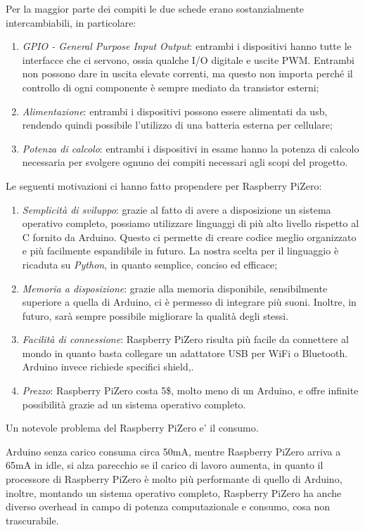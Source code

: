 \documentclass[12pt]{article}
\newcommand{\raspi}{Raspberry Pi}
\newcommand{\raszero} {\raspi Zero}
\begin{document}
Per la maggior parte dei compiti le due schede erano sostanzialmente intercambiabili, in particolare:
\begin{enumerate}
\item \emph{GPIO - General Purpose Input Output}: entrambi i dispositivi hanno tutte le interfacce che ci servono, ossia qualche I/O digitale e uscite PWM. Entrambi non possono dare in uscita elevate correnti, ma questo non importa perché il controllo di ogni componente è sempre mediato da transistor esterni;
\item \emph{Alimentazione}: entrambi i dispositivi possono essere alimentati da usb, rendendo quindi possibile l'utilizzo di una batteria esterna per cellulare;
\item \emph{Potenza di calcolo}: entrambi i dispositivi in esame hanno la potenza di calcolo necessaria per svolgere ognuno dei compiti necessari agli scopi del progetto.
\end{enumerate} 

Le seguenti motivazioni ci hanno fatto propendere per \raszero :
\begin{enumerate}
\item \emph{Semplicità di sviluppo}: grazie al fatto di avere a disposizione un sistema operativo completo, possiamo utilizzare linguaggi di più alto livello rispetto al C fornito da Arduino. Questo ci permette di creare codice meglio organizzato e più facilmente espandibile in futuro. La nostra scelta per il linguaggio è ricaduta su \emph{Python}, in quanto semplice, conciso ed efficace;
\item \emph{Memoria a disposizione}: grazie alla memoria disponibile, sensibilmente superiore a quella di Arduino, ci è permesso di integrare più suoni. Inoltre, in futuro, sarà sempre possibile migliorare la qualità degli stessi.
\item \emph{Facilità di connessione}: \raszero{} risulta più facile da connettere al mondo in quanto basta collegare un adattatore USB per WiFi o Bluetooth. Arduino invece richiede specifici shield,.
\item \emph{Prezzo}: \raszero{} costa 5\$, molto meno di un Arduino, e offre infinite possibilità grazie ad un sistema operativo completo.
\end{enumerate}

Un notevole problema del \raszero{} e' il consumo.

Arduino senza carico consuma circa 50mA, mentre \raszero{} arriva a 65mA in idle, si alza parecchio se il carico di lavoro aumenta, in quanto il processore di \raszero{} è molto più performante di quello di Arduino, inoltre, montando un sistema operativo completo, \raszero{} ha anche diverso overhead in campo di potenza computazionale e consumo, cosa non trascurabile.
\end{document}
